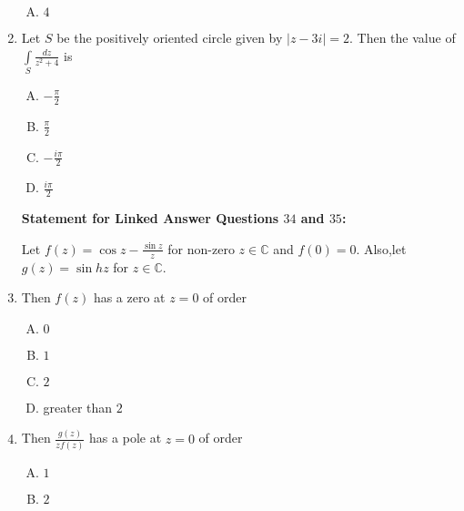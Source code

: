 \documentclass[12pt,a4paper]{article}
\begin{document}
\begin{enumerate}
\begin{enumerate}[(A)]
\item $
4
$

\end{enumerate} 


\item Let $S$ be the positively oriented circle given by $ \mid z- 3 i\mid =2 $. Then the value of 
$\int\limits_{S} \frac{dz}{z^2+4} $ is


\begin{enumerate}[(A)]

\item $
-\frac{\pi}{2}
$

\item $
\frac{\pi}{2}
$

\item $
-\frac{i \pi}{2}
$

\item $
\frac{i \pi}{2}
$

\end{enumerate}

\begin{center}

\centering\textbf{Statement for Linked Answer Questions $34$ and $35 $:}

\end{center}


Let $f(z) = \cos z - \frac{\sin z}{z} $ for non-zero $z \in \mathbb{C}$ and $f(0)=0$. Also,let $g(z)=\sin hz $ for $z \in \mathbb{C}$.

\item Then $f(z)$ has a zero at $z=0$ of order

\begin{enumerate}[(A)]

\item $
0
$

\item $
1
$

\item $
2
$

\item 
greater than $2$


\end{enumerate}

\item Then $\frac{g(z)}{z f(z)}$ has a pole at $z=0$ of order

\begin{enumerate}[(A)]

\item $
1
$

\item $
2
$


\end{enumerate}
\end{enumerate}
\end{document}
